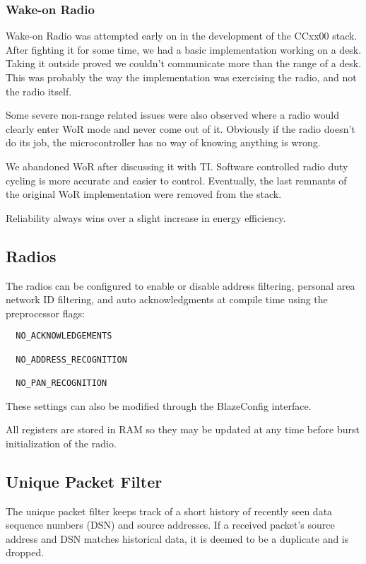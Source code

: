 \documentclass{article}
\begin{document}
\subsubsection{Wake-on Radio}
\label{sec:wor}
Wake-on Radio \cite{cc1101datasheet} was attempted early on in the development of the CCxx00 stack. After
fighting it for some time, we had a basic implementation working on a desk. Taking it
outside proved we couldn't communicate more than the range of a desk. This was probably
the way the implementation was exercising the radio, and not the radio itself.

Some severe non-range related issues were also observed where a radio would clearly 
enter WoR mode and never come out of it. Obviously if the radio doesn't do its job, 
the microcontroller has no way of knowing anything is wrong.

We abandoned WoR after discussing it with TI. Software controlled radio duty cycling is 
more accurate and easier to control. Eventually, the last remnants of the original WoR 
implementation were removed from the stack. 

Reliability always wins over a slight increase in energy efficiency.

\subsection{Radios}
\label{sec:radios}
The radios can be configured to enable or disable address filtering, personal area network
ID filtering, and auto acknowledgments at compile time using the preprocessor flags:

\begin{verbatim}
  NO_ACKNOWLEDGEMENTS
  
  NO_ADDRESS_RECOGNITION
  
  NO_PAN_RECOGNITION
\end{verbatim}

These settings can also be modified through the BlazeConfig interface.

All registers are stored in RAM so they may be updated at any time before burst initialization
of the radio. 

\subsection{Unique Packet Filter}
\label{sec:unique}
The unique packet filter keeps track of a short history of recently seen data sequence numbers (DSN) and source
addresses. If a received packet's source address and DSN matches historical data, it is deemed to be a duplicate
and is dropped.  
\end{document}
